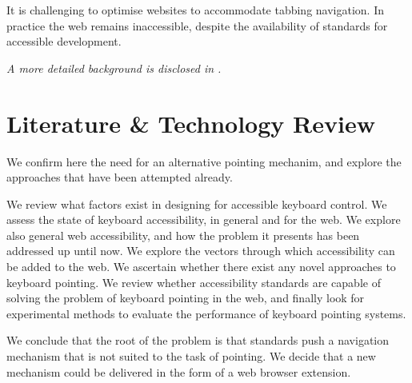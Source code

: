 \documentclass[a4paper, 12pt]{report}
\begin{document}
It is challenging to optimise websites to accommodate tabbing navigation. In practice the web remains inaccessible, despite the availability of standards for accessible development.

\textit{A more detailed background is disclosed in .}
\section{Literature \& Technology Review}
We confirm here the need for an alternative pointing mechanim, and explore the approaches that have been attempted already.

We review what factors exist in designing for accessible keyboard control. We assess the state of keyboard accessibility, in general and for the web. We explore also general web accessibility, and how the problem it presents has been addressed up until now. We explore the vectors through which accessibility can be added to the web. We ascertain whether there exist any novel approaches to keyboard pointing. We review whether accessibility standards are capable of solving the problem of keyboard pointing in the web, and finally look for experimental methods to evaluate the performance of keyboard pointing systems.

We conclude that the root of the problem is that standards push a navigation mechanism that is not suited to the task of pointing. We decide that a new mechanism could be delivered in the form of a web browser extension.
\end{document}

